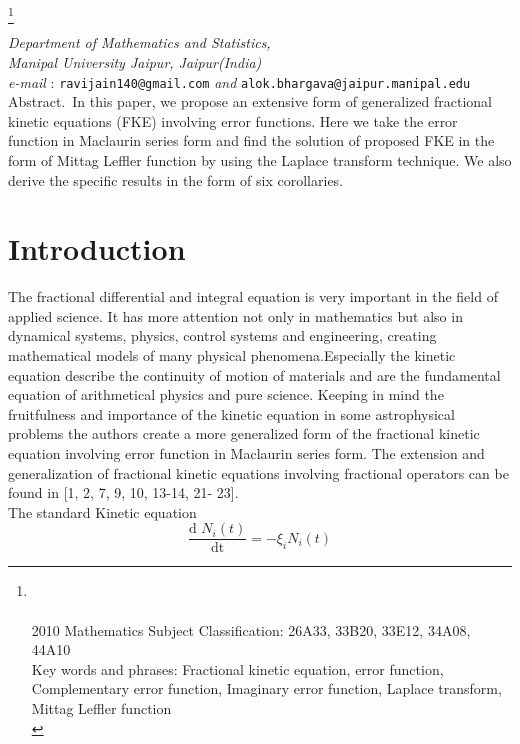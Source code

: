 \documentclass[leqno]{article}
\begin{document}
\thispagestyle{plain}     
\markboth{}{}
\footnote{{}\\ \\[-0.7cm]
2010 Mathematics Subject Classification: 26A33, 33B20, 33E12, 34A08, 44A10\\
Key words and phrases: Fractional kinetic equation, error function, Complementary error function, Imaginary error function, Laplace transform, Mittag Leffler function\\
} 

\vspace{0.15in}
\newline
{\it Department of Mathematics and Statistics,\\Manipal University Jaipur, Jaipur(India)\\
e-mail} : {\verb|ravijain140@gmail.com|} {\it and} {\verb|alok.bhargava@jaipur.manipal.edu|}
\vspace{0.15in}\\
{\footnotesize{\sc Abstract.}\ In this paper, we propose an extensive form of generalized fractional kinetic equations (FKE) involving error functions. 
Here we take the error function in Maclaurin series form and find the solution of proposed FKE in the form of Mittag Leffler function by using the Laplace transform technique. We also derive the specific results in the form of six corollaries.
}
\section{Introduction}
\vspace{0.1in}
\indent
The fractional differential and integral equation is very important in the field of applied science. It has more attention not only in mathematics but also in dynamical systems, physics, control systems and engineering, creating mathematical models of many physical phenomena.Especially the kinetic equation describe the continuity of motion of materials and are the fundamental equation of arithmetical physics and pure science. Keeping in mind the fruitfulness and importance of the kinetic equation in some astrophysical problems the authors create a more generalized form of the fractional kinetic equation involving error function in Maclaurin series form. The extension and generalization of fractional kinetic equations involving fractional operators can be found in [1, 2, 7, 9, 10, 13-14, 21- 23].\\
The standard Kinetic equation
\begin{equation}
    \frac{\text{d $N_i(t)$}}{\text{dt}}
    = -\xi _i N_i(t)
\end{equation}
\end{document}
